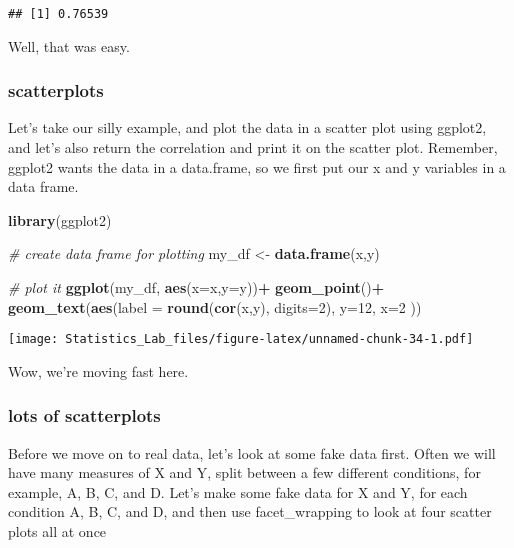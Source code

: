 \documentclass[
]{book}
\newenvironment{Shaded}{\begin{snugshade}}{\end{snugshade}}
\newcommand{\AttributeTok}[1]{\textcolor[rgb]{0.13,0.29,0.53}{#1}}
\newcommand{\CommentTok}[1]{\textcolor[rgb]{0.56,0.35,0.01}{\textit{#1}}}
\newcommand{\DecValTok}[1]{\textcolor[rgb]{0.00,0.00,0.81}{#1}}
\newcommand{\FunctionTok}[1]{\textcolor[rgb]{0.13,0.29,0.53}{\textbf{#1}}}
\newcommand{\NormalTok}[1]{#1}
\newcommand{\OtherTok}[1]{\textcolor[rgb]{0.56,0.35,0.01}{#1}}
\newcommand{\SpecialCharTok}[1]{\textcolor[rgb]{0.81,0.36,0.00}{\textbf{#1}}}
\begin{document}
\begin{verbatim}
## [1] 0.76539
\end{verbatim}

Well, that was easy.

\hypertarget{scatterplots}{%
\subsubsection{scatterplots}\label{scatterplots}}

Let's take our silly example, and plot the data in a scatter plot using ggplot2, and let's also return the correlation and print it on the scatter plot. Remember, ggplot2 wants the data in a data.frame, so we first put our x and y variables in a data frame.

\begin{Shaded}
\begin{Highlighting}[]
\FunctionTok{library}\NormalTok{(ggplot2)}

\CommentTok{\# create data frame for plotting}
\NormalTok{my\_df }\OtherTok{\textless{}{-}} \FunctionTok{data.frame}\NormalTok{(x,y)}

\CommentTok{\# plot it}
\FunctionTok{ggplot}\NormalTok{(my\_df, }\FunctionTok{aes}\NormalTok{(}\AttributeTok{x=}\NormalTok{x,}\AttributeTok{y=}\NormalTok{y))}\SpecialCharTok{+}
  \FunctionTok{geom\_point}\NormalTok{()}\SpecialCharTok{+}
  \FunctionTok{geom\_text}\NormalTok{(}\FunctionTok{aes}\NormalTok{(}\AttributeTok{label =} \FunctionTok{round}\NormalTok{(}\FunctionTok{cor}\NormalTok{(x,y), }\AttributeTok{digits=}\DecValTok{2}\NormalTok{), }\AttributeTok{y=}\DecValTok{12}\NormalTok{, }\AttributeTok{x=}\DecValTok{2}\NormalTok{ ))}
\end{Highlighting}
\end{Shaded}

\texttt{[image: Statistics\_Lab\_files/figure-latex/unnamed-chunk-34-1.pdf]}

Wow, we're moving fast here.

\hypertarget{lots-of-scatterplots}{%
\subsubsection{lots of scatterplots}\label{lots-of-scatterplots}}

Before we move on to real data, let's look at some fake data first. Often we will have many measures of X and Y, split between a few different conditions, for example, A, B, C, and D. Let's make some fake data for X and Y, for each condition A, B, C, and D, and then use facet\_wrapping to look at four scatter plots all at once
\end{document}
